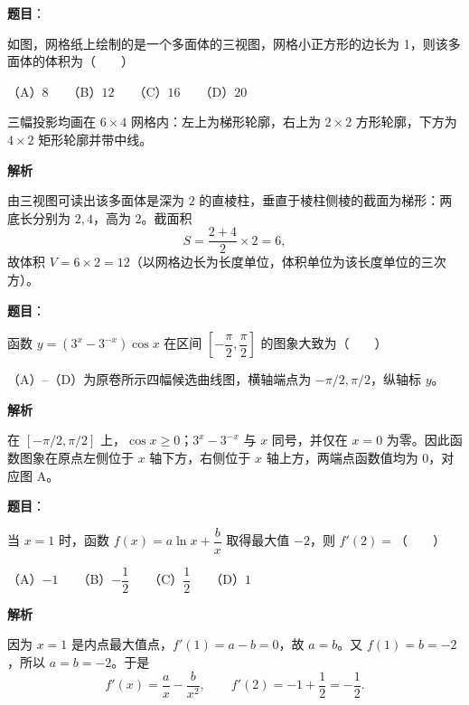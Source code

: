 \begin{answer}

\textbf{题目}：

如图，网格纸上绘制的是一个多面体的三视图，网格小正方形的边长为 1，则该多面体的体积为\mbox{（　　）}

（A）$8$　　（B）$12$　　（C）$16$　　（D）$20$

三幅投影均画在 $6\times4$ 网格内：左上为梯形轮廓，右上为 $2\times2$ 方形轮廓，下方为 $4\times2$ 矩形轮廓并带中线。
\nopagebreak[4]
\begin{center}\end{center}
\nopagebreak[4]
\textbf{解析}

由三视图可读出该多面体是深为 $2$ 的直棱柱，垂直于棱柱侧棱的截面为梯形：两底长分别为 $2,4$，高为 $2$。截面积
\nopagebreak[4]
\[
S=\frac{2+4}{2}\times2=6,
\]
故体积 $V=6\times2=12$（以网格边长为长度单位，体积单位为该长度单位的三次方）。


\end{answer}
\begin{answer}

\textbf{题目}：

函数 $y=(3^x-3^{-x})\cos x$ 在区间 $\left[-\dfrac\pi2,\dfrac\pi2\right]$ 的图象大致为\mbox{（　　）}

（A）–（D）为原卷所示四幅候选曲线图，横轴端点为 $-\pi/2,\pi/2$，纵轴标 $y$。
\nopagebreak[4]
\begin{center}\end{center}
\nopagebreak[4]
\textbf{解析}

在 $[-\pi/2,\pi/2]$ 上，$\cos x\ge0$；$3^x-3^{-x}$ 与 $x$ 同号，并仅在 $x=0$ 为零。因此函数图象在原点左侧位于 $x$ 轴下方，右侧位于 $x$ 轴上方，两端点函数值均为 $0$，对应图 A。


\end{answer}
\begin{answer}

\textbf{题目}：

当 $x=1$ 时，函数 $f(x)=a\ln x+\dfrac bx$ 取得最大值 $-2$，则 $f'(2)=$\mbox{（　　）}

（A）$-1$　　（B）$-\dfrac12$　　（C）$\dfrac12$　　（D）$1$

\textbf{解析}

因为 $x=1$ 是内点最大值点，$f'(1)=a-b=0$，故 $a=b$。又 $f(1)=b=-2$，所以 $a=b=-2$。于是
\nopagebreak[4]
\[
f'(x)=\frac ax-\frac b{x^2},\qquad f'(2)=-1+\frac12=-\frac12.
\]


\end{answer}
